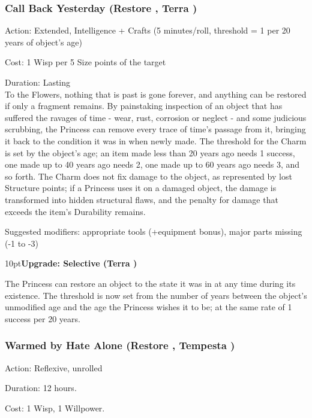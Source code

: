 \subsubsection*{Call Back Yesterday (Restore \textbullet, Terra \textbullet)}

\noindent Action: Extended, Intelligence + Crafts (5 minutes/roll, threshold = 1 per 20 years of object's age)

\noindent Cost: 1 Wisp per 5 Size points of the target

\noindent Duration: Lasting \\

\noindent To the Flowers, nothing that is past is gone forever, and anything can be restored if only a fragment remains. By painstaking inspection of an object that has suffered the ravages of time - wear, rust, corrosion or neglect - and some judicious scrubbing, the Princess can remove every trace of time's passage from it, bringing it back to the condition it was in when newly made. The threshold for the Charm is set by the object's age; an item made less than 20 years ago needs 1 success, one made up to 40 years ago needs 2, one made up to 60 years ago needs 3, and so forth. The Charm does not fix damage to the object, as represented by lost Structure points; if a Princess uses it on a damaged object, the damage is transformed into hidden structural flaws, and the penalty for damage that exceeds the item's Durability remains.

Suggested modifiers: appropriate tools (+equipment bonus), major parts missing (-1 to -3)
\begin{myindentpar}{10pt}\textbf{Upgrade: Selective (Terra \textbullet\textbullet)}

The Princess can restore an object to the state it was in at any time during its existence. The threshold is now set from the number of years between the object's unmodified age and the age the Princess wishes it to be; at the same rate of 1 success per 20 years.\end{myindentpar}
\subsubsection*{Warmed by Hate Alone (Restore \textbullet, Tempesta \textbullet\textbullet)}

\noindent Action: Reflexive, unrolled

\noindent Duration: 12 hours.

\noindent Cost: 1 Wisp, 1 Willpower.

